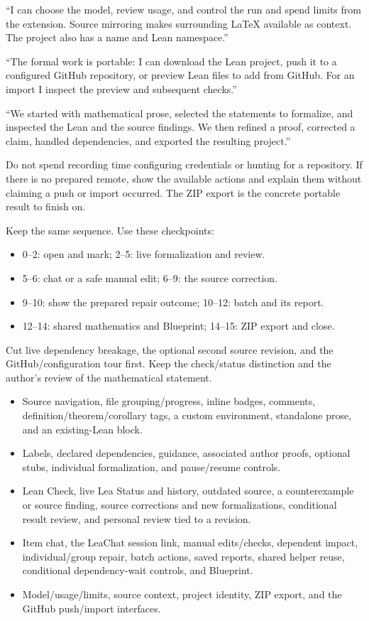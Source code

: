 \say
``I can choose the model, review usage, and control the run and spend limits
from the extension. Source mirroring makes surrounding LaTeX available as
context. The project also has a name and Lean namespace.''

``The formal work is portable: I can download the Lean project, push it to
a configured GitHub repository, or preview Lean files to add from GitHub.
For an import I inspect the preview and subsequent checks.''

``We started with mathematical prose, selected the statements to formalize,
and inspected the Lean and the source findings. We then refined a proof,
corrected a claim, handled dependencies, and exported the resulting project.''

\fallback
Do not spend recording time configuring credentials or hunting for a repository.
If there is no prepared remote, show the available actions and explain them
without claiming a push or import occurred. The ZIP export is the concrete
portable result to finish on.

\clearpage
{}

Keep the same sequence. Use these checkpoints:
\begin{itemize}
  \item 0--2: open and mark; 2--5: live formalization and review.
  \item 5--6: chat or a safe manual edit; 6--9: the source correction.
  \item 9--10: show the prepared repair outcome; 10--12: batch and its report.
  \item 12--14: shared mathematics and Blueprint; 14--15: ZIP export and close.
\end{itemize}
Cut live dependency breakage, the optional second source revision, and the
GitHub/configuration tour first. Keep the check/status distinction and the
author's review of the mathematical statement.

\begin{itemize}
  \item Source navigation, file grouping/progress, inline badges, comments,
    definition/theorem/corollary tags, a custom environment, standalone prose,
    and an existing-Lean block.
  \item Labels, declared dependencies, guidance, associated author proofs,
    optional stubs, individual formalization, and pause/resume controls.
  \item Lean Check, live Lea Status and history, outdated source, a counterexample
    or source finding, source corrections and new formalizations, conditional
    result review, and personal review tied to a revision.
  \item Item chat, the LeaChat session link, manual edits/checks, dependent impact,
    individual/group repair, batch actions, saved reports, shared helper reuse,
    conditional dependency-wait controls, and Blueprint.
  \item Model/usage/limits, source context, project identity, ZIP export, and the
    GitHub push/import interfaces.
\end{itemize}

